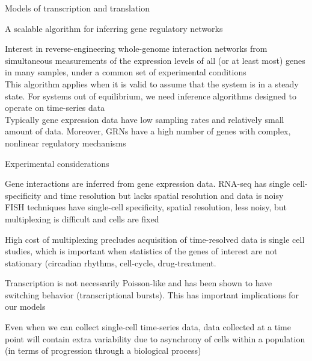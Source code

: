 \documentclass[aspectratio=1610]{beamer}					%
\begin{document}
\begin{frame}{Models of transcription and translation}
\end{frame}



\begin{frame}{A scalable algorithm for inferring gene regulatory networks}

Interest in reverse-engineering whole-genome interaction networks from simultaneous measurements of the
expression levels of all (or at least most) genes in many
samples, under a common set of experimental conditions\\
\vspace{0.2in}
This algorithm applies when it is valid to assume that the system is in a steady state. For systems out of equilibrium, we need inference algorithms designed to operate on time-series data\\
\vspace{0.2in}
Typically gene expression data have low sampling rates and relatively small
amount of data. Moreover, GRNs have a high number of genes
with complex, nonlinear regulatory mechanisms

\end{frame}


\begin{frame}{Experimental considerations}

Gene interactions are inferred from gene expression data. RNA-seq has single cell-specificity and time resolution but lacks spatial resolution and data is noisy\\
\vspace{0.2in}
FISH techniques have single-cell specificity, spatial resolution, less noisy, but multiplexing is difficult and cells are fixed\\
\vspace{0.2in}

High cost of multiplexing precludes acquisition of time-resolved data is single cell studies, which is important when statistics of the genes of interest are not stationary (circadian rhythms, cell-cycle, drug-treatment.\\
\vspace{0.2in}

Transcription is not necessarily Poisson-like and has been shown to have switching behavior (transcriptional bursts). This has important implications for our models\\
\vspace{0.2in}

Even when we can collect single-cell time-series data, data collected at a time point will contain extra variability due to asynchrony of cells within a population (in terms of progression through a biological process)\\

\end{frame}
\end{document}
